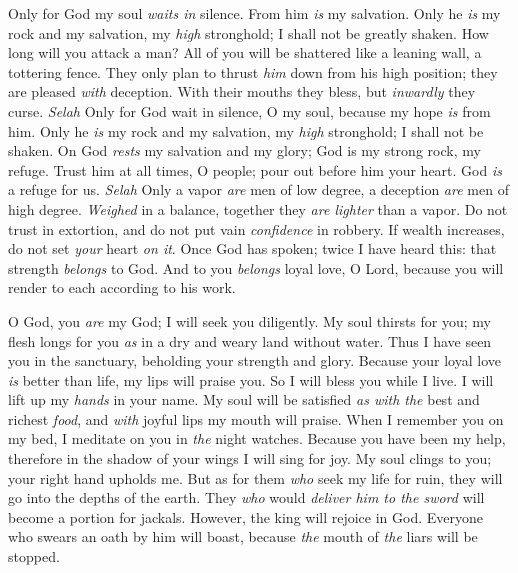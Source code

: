 \begin{biblechapter} %
 Only for God my soul \textit{waits in} silence. 
From him \textit{is} my salvation.
\verse Only he \textit{is} my rock and my salvation, 
my \textit{high} stronghold; I shall not be greatly shaken.
\verse How long will you attack a man? 
All of you will be shattered 
like a leaning wall, a tottering fence.
\verse They only plan to thrust \textit{him} down from his high position; 
they are pleased \textit{with} deception. 
With their mouths they bless, 
but \textit{inwardly} they curse. \textit{Selah}
\verse Only for God wait in silence, O my soul, 
because my hope \textit{is} from him.
\verse Only he \textit{is} my rock and my salvation, 
my \textit{high} stronghold; I shall not be shaken.
\verse On God \textit{rests} my salvation and my glory; 
God is my strong rock, my refuge.
\verse Trust him at all times, O people; 
pour out before him your heart. 
God \textit{is} a refuge for us. \textit{Selah}
\verse Only a vapor \textit{are} men of low degree, 
a deception \textit{are} men of high degree. 
\textit{Weighed} in a balance, 
together they \textit{are lighter} than a vapor.
\verse Do not trust in extortion, 
and do not put vain \textit{confidence} in robbery. 
If wealth increases, 
do not set \textit{your} heart \textit{on it}.
\verse Once God has spoken; 
twice I have heard this: 
that strength \textit{belongs} to God.
\verse And to you \textit{belongs} loyal love, O Lord, 
because you will render to each according to his work.
\end{biblechapter}

\begin{biblechapter} %
 O God, you \textit{are} my God; 
I will seek you diligently. 
My soul thirsts for you; my flesh longs for you 
\textit{as} in a dry and weary land without water.
\verse Thus I have seen you in the sanctuary, 
beholding your strength and glory.
\verse Because your loyal love \textit{is} better than life, 
my lips will praise you.
\verse So I will bless you while I live. 
I will lift up my \textit{hands} in your name.
\verse My soul will be satisfied \textit{as with the} best and richest \textit{food}, 
and \textit{with} joyful lips my mouth will praise.
\verse When I remember you on my bed, 
I meditate on you in \textit{the} night watches.
\verse Because you have been my help, 
therefore in the shadow of your wings I will sing for joy.
\verse My soul clings to you; 
your right hand upholds me.
\verse But as for them \textit{who} seek my life for ruin, 
they will go into the depths of the earth.
\verse They \textit{who} would \textit{deliver him to the sword} 
will become a portion for jackals.
\verse However, the king will rejoice in God. 
Everyone who swears an oath by him will boast, 
because \textit{the} mouth of \textit{the} liars will be stopped.
\end{biblechapter}

